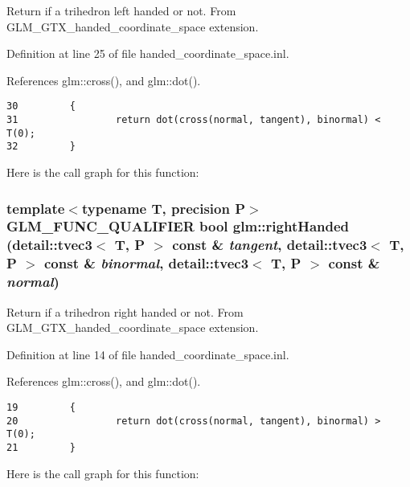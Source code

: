 Return if a trihedron left handed or not. From GLM\_\-GTX\_\-handed\_\-coordinate\_\-space extension. 

Definition at line 25 of file handed\_\-coordinate\_\-space.inl.

References glm::cross(), and glm::dot().

\begin{Code}\begin{verbatim}30         {
31                 return dot(cross(normal, tangent), binormal) < T(0);
32         }
\end{verbatim}
\end{Code}




Here is the call graph for this function:\hypertarget{group__gtx__handed__coordinate__space_g65f766ab3c8924b90eabc0e1ecf014d1}{
\subsubsection[rightHanded]{\setlength{\rightskip}{0pt plus 5cm}template$<$typename T, precision P$>$ GLM\_\-FUNC\_\-QUALIFIER bool glm::rightHanded (detail::tvec3$<$ T, P $>$ const \& {\em tangent}, \/  detail::tvec3$<$ T, P $>$ const \& {\em binormal}, \/  detail::tvec3$<$ T, P $>$ const \& {\em normal})}}
\label{group__gtx__handed__coordinate__space_g65f766ab3c8924b90eabc0e1ecf014d1}


Return if a trihedron right handed or not. From GLM\_\-GTX\_\-handed\_\-coordinate\_\-space extension. 

Definition at line 14 of file handed\_\-coordinate\_\-space.inl.

References glm::cross(), and glm::dot().

\begin{Code}\begin{verbatim}19         {
20                 return dot(cross(normal, tangent), binormal) > T(0);
21         }
\end{verbatim}
\end{Code}




Here is the call graph for this function: